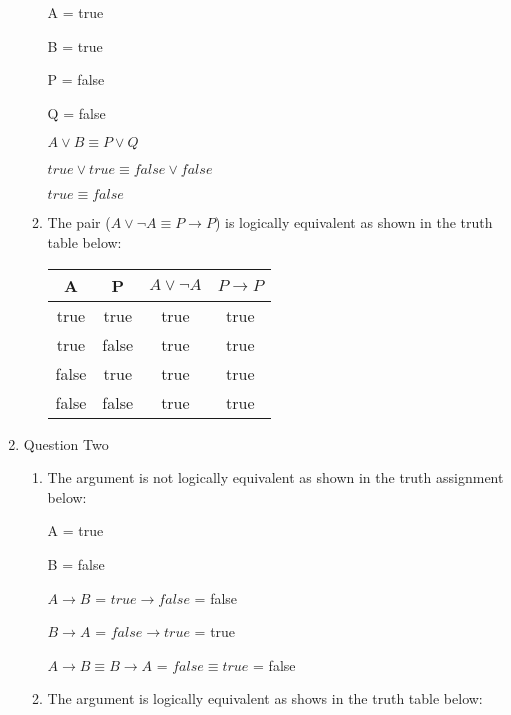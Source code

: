 \documentclass{article}
\begin{document}
\begin{enumerate}
\begin{enumerate}
        A = true

        B = true

        P = false

        Q = false

        $A \lor B \equiv P \lor Q$

        $true \lor true \equiv false \lor false$
        
        $true \equiv false$
        \item The pair ($A \lor \neg A \equiv P \rightarrow P$) is logically equivalent as shown in the truth table below:
        
        \begin{tabular}{| c | c | c | c |}
            \hline
            A & P & $A \lor \neg A$ & $P \rightarrow P$ \\
            \hline
            true & true & true & true \\
            \hline
            true & false & true & true \\
            \hline
            false & true & true & true \\
            \hline
            false & false & true & true \\
            \hline
        \end{tabular}
    \end{enumerate}
    \item Question Two
    \begin{enumerate}
        \item
        The argument is not logically equivalent as shown in the truth assignment below:

        A = true

        B = false

        $A \rightarrow B$ = $true \rightarrow false$ = false

        $B \rightarrow A$ = $false \rightarrow true$ = true

        $A \rightarrow B \equiv B \rightarrow A$ = $false \equiv true$ = false
        \item
        The argument is logically equivalent as shows in the truth table below:


\end{enumerate}
\end{enumerate}
\end{document}
